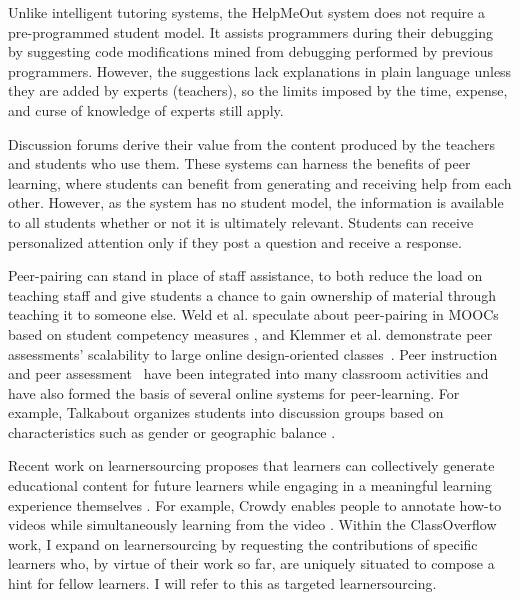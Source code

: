 Unlike intelligent tutoring systems, the HelpMeOut system \cite{helpmeout} does not require a pre-programmed student model. It assists programmers during their debugging by suggesting code modifications mined from debugging performed by previous programmers. However, the suggestions lack explanations in plain language unless they are added by experts (teachers), so the limits imposed by the time, expense, and curse of knowledge of experts still apply.

Discussion forums derive their value from the content produced by the teachers and students who use them. These systems can harness the benefits of peer learning, where students can benefit from generating and receiving help from each other. However, as the system has no student model, the information is available to all students whether or not it is ultimately relevant. Students can receive personalized attention only if they post a question and receive a response. 

Peer-pairing can stand in place of staff assistance, to both reduce the load on teaching staff and give students a chance to gain ownership of material through teaching it to someone else. Weld et al. speculate about peer-pairing in MOOCs based on student competency measures \cite{WeldHcomp12}, and Klemmer et al. demonstrate peer assessments' scalability to large online design-oriented classes~\cite{Klemmer}. Peer instruction~\cite{mazur} and peer assessment~\cite{peerassessment} have been integrated into many classroom activities and have also formed the basis of several online systems for peer-learning. For example, Talkabout organizes students into discussion groups based on characteristics such as gender or geographic balance \cite{talkabout}.

Recent work on learnersourcing proposes that learners can collectively generate educational content for future learners while engaging in a meaningful learning experience themselves \cite{kim2013learnersourcing,weir2015,mitros2015}. For example, Crowdy enables people to annotate how-to videos while simultaneously learning from the video \cite{weir2015}. Within the ClassOverflow work, I expand on learnersourcing by requesting the contributions of specific learners who, by virtue of their work so far, are uniquely situated to compose a hint for fellow learners. I will refer to this as targeted learnersourcing.

